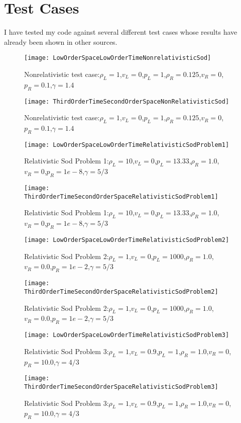 \pagebreak
\section{Test Cases}
I have tested my code against several different test cases whose results have already been shown in other sources. 
\begin{figure}[h!]
        \centering
        \texttt{[image: LowOrderSpaceLowOrderTimeNonrelativisticSod]}
        \caption{Nonrelativistic test case:$\rho_L=1$,$v_L=0$,$p_L=1$,$\rho_R=0.125$,$v_R=0$,$p_R=0.1$,$\gamma=1.4$ }
\end{figure}

\begin{figure}[h!]
        \centering
        \texttt{[image: ThirdOrderTimeSecondOrderSpaceNonRelativisticSod]}
        \caption{Nonrelativistic test case:$\rho_L=1$,$v_L=0$,$p_L=1$,$\rho_R=0.125$,$v_R=0$,$p_R=0.1$,$\gamma=1.4$ }
\end{figure}

\begin{figure}[h!]
        \centering
        \texttt{[image: LowOrderSpaceLowOrderTimeRelativisticSodProblem1]}
        \caption{Relativistic Sod Problem 1:$\rho_L=10$,$v_L=0$,$p_L=13.33$,$\rho_R=1.0$,$v_R=0$,$p_R=1e-8$,$\gamma=5/3$ }
\end{figure}

\begin{figure}[h!]
        \centering
        \texttt{[image: ThirdOrderTimeSecondOrderSpaceRelativisticSodProblem1]}
        \caption{Relativistic Sod Problem 1:$\rho_L=10$,$v_L=0$,$p_L=13.33$,$\rho_R=1.0$,$v_R=0$,$p_R=1e-8$,$\gamma=5/3$ }
\end{figure}

\begin{figure}[h!]
        \centering
        \texttt{[image: LowOrderSpaceLowOrderTimeRelativisticSodProblem2]}
        \caption{Relativistic Sod Problem 2:$\rho_L=1$,$v_L=0$,$p_L=1000$,$\rho_R=1.0$,$v_R=0.0$,$p_R=1e-2$,$\gamma=5/3$ }
\end{figure}

\begin{figure}[h!]
        \centering
        \texttt{[image: ThirdOrderTimeSecondOrderSpaceRelativisticSodProblem2]}
        \caption{Relativistic Sod Problem 2:$\rho_L=1$,$v_L=0$,$p_L=1000$,$\rho_R=1.0$,$v_R=0.0$,$p_R=1e-2$,$\gamma=5/3$ }
\end{figure}

\begin{figure}[h!]
        \centering
        \texttt{[image: LowOrderSpaceLowOrderTimeRelativisticSodProblem3]}
        \caption{Relativistic Sod Problem 3:$\rho_L=1$,$v_L=0.9$,$p_L=1$,$\rho_R=1.0$,$v_R=0$,$p_R=10.0$,$\gamma=4/3$ }
\end{figure}

\begin{figure}[h!]
        \centering
        \texttt{[image: ThirdOrderTimeSecondOrderSpaceRelativisticSodProblem3]}
        \caption{Relativistic Sod Problem 3:$\rho_L=1$,$v_L=0.9$,$p_L=1$,$\rho_R=1.0$,$v_R=0$,$p_R=10.0$,$\gamma=4/3$ }
\end{figure}
